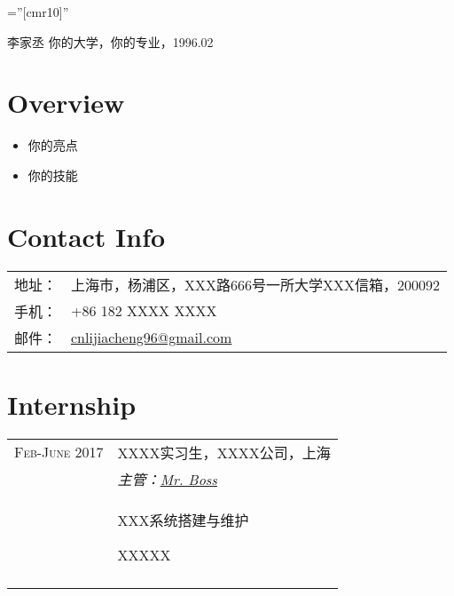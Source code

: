 \documentclass[a4paper,10pt]{article}
\begin{document}

\pagestyle{empty} %

\font\fb=''[cmr10]'' %

\par{\centering
        {\Large 李家丞
        \linebreak\footnotesize{你的大学，你的专业，1996.02}
    }\bigskip\par}


\section{Overview}
\begin{itemize}
    \item 你的亮点
    \item 你的技能
\end{itemize}

\section{Contact Info}

\begin{tabular}{rl}
    \textsc{地址：}   & 上海市，杨浦区，XXX路666号一所大学XXX信箱，200092\\
    \textsc{手机：}     & +86 182 XXXX XXXX\\
    \textsc{邮件：}     & \href{mailto:cnlijiacheng96@gmail.com}{cnlijiacheng96@gmail.com}
\end{tabular}

\section{Internship}
\begin{tabular}{r|p{11cm}}
 \textsc{Feb-June 2017} & XXXX实习生，\textsc{XXXX公司}，上海 \\&\emph{\textsc{主管：}\hspace{0.2cm}\href{mailto:your.boss@company.com}{Mr. Boss}}\\&
\begin{itemize}
  \footnotesize{
  \item XXX系统搭建与维护
  \item XXXXX}
\end{itemize}
\\\multicolumn{2}{c}{} \\
\end{tabular}
\end{document}
